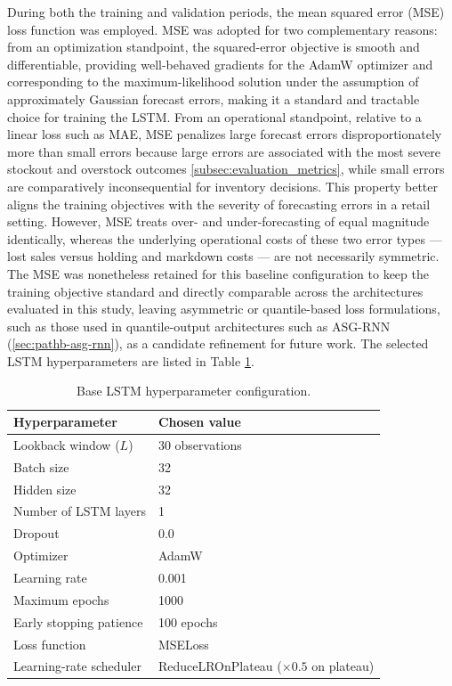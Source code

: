 During both the training and validation periods, the mean squared error (MSE) loss function was employed. MSE was adopted for two complementary reasons: from an optimization standpoint, the squared-error objective is smooth and differentiable, providing well-behaved gradients for the AdamW optimizer and corresponding to the maximum-likelihood solution under the assumption of approximately Gaussian forecast errors, making it a standard and tractable choice for training the LSTM. From an operational standpoint, relative to a linear loss such as MAE, MSE penalizes large forecast errors disproportionately more than small errors because large errors are associated with the most severe stockout and overstock outcomes \ref{subsec:evaluation_metrics}, while small errors are comparatively inconsequential for inventory decisions. This property better aligns the training objectives with the severity of forecasting errors in a retail setting. However, MSE treats over- and under-forecasting of equal magnitude identically, whereas the underlying operational costs of these two error types — lost sales versus holding and markdown costs — are not necessarily symmetric. The MSE was nonetheless retained for this baseline configuration to keep the training objective standard and directly comparable across the architectures evaluated in this study, leaving asymmetric or quantile-based loss formulations, such as those used in quantile-output architectures such as ASG-RNN (\ref{sec:pathb-asg-rnn}), as a candidate refinement for future work.
The selected LSTM hyperparameters are listed in Table \ref{tab:lstm_hyperparameters}.

\begin{table}[H]
\centering
\caption{Base LSTM hyperparameter configuration.}
\label{tab:lstm_hyperparameters}
\begin{tabular}{ll}
\hline
\textbf{Hyperparameter} & \textbf{Chosen value} \\
\hline
Lookback window ($L$) & 30 observations \\
Batch size & 32 \\
Hidden size & 32 \\
Number of LSTM layers & 1 \\
Dropout & 0.0 \\
Optimizer & AdamW \\
Learning rate & 0.001 \\
Maximum epochs & 1000 \\
Early stopping patience & 100 epochs \\
Loss function & MSELoss \\
Learning-rate scheduler & ReduceLROnPlateau ($\times 0.5$ on plateau) \\
\hline
\end{tabular}
\end{table}



